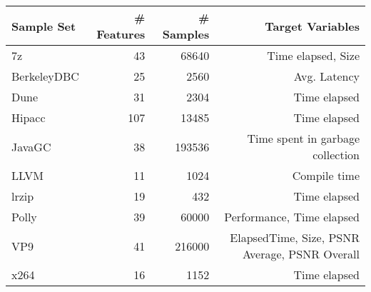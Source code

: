 \documentclass{article}
\begin{document}
\begin{table}[ht]
\begin{adjustbox}{max width=1.1\textwidth,center}
\begin{tabular}{l r r r}
\toprule
Sample Set & \# Features & \# Samples & Target Variables\\
\midrule
7z & 43 & 68640 & Time elapsed, Size \\
BerkeleyDBC & 25 & 2560 & Avg. Latency \\
Dune & 31 & 2304 & Time elapsed \\
Hipacc & 107 & 13485 & Time elapsed \\
JavaGC & 38 & 193536 & Time spent in garbage collection \\
LLVM & 11 & 1024 & Compile time \\
lrzip & 19 & 432 & Time elapsed \\
Polly & 39 & 60000 & Performance, Time elapsed \\
VP9 & 41 & 216000 & ElapsedTime, Size, PSNR Average, PSNR Overall \\
x264 & 16 & 1152 & Time elapsed \\
\bottomrule
\end{tabular}
\end{adjustbox}
\end{table}
\end{document}
